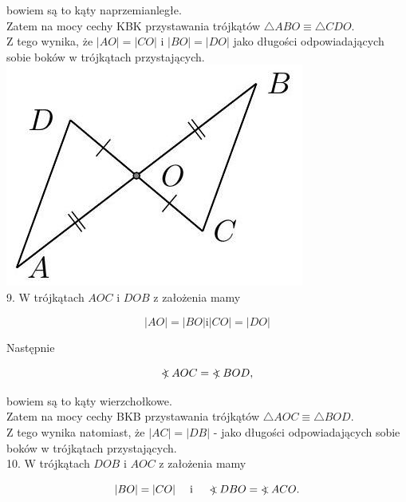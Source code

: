 \documentclass[10pt]{article}
\newcommand\Varangle{\mathop{{<\!\!\!\!\!\text{\small)}}\:}\nolimits}
\begin{document}
bowiem są to kąty naprzemianległe.\\
Zatem na mocy cechy KBK przystawania trójkątów \(\triangle A B O \equiv \triangle C D O\).\\
Z tego wynika, że \(|A O|=|C O|\) i \(|B O|=|D O|\) jako długości odpowiadających sobie boków w trójkątach przystających.\\
\includegraphics[max width=\textwidth, center]{2024_11_21_71f62bd117d375398909g-060(2)}\\
9. W trójkątach \(A O C\) i \(D O B\) z założenia mamy

\[
|A O|=|B O| \mathrm{i}|C O|=|D O|
\]

Następnie

\[
\Varangle A O C=\Varangle B O D,
\]

bowiem są to kąty wierzchołkowe.\\
Zatem na mocy cechy BKB przystawania trójkątów \(\triangle A O C \equiv \triangle B O D\).\\
Z tego wynika natomiast, że \(|A C|=|D B|\) - jako długości odpowiadających sobie boków w trójkątach przystających.\\
10. W trójkątach \(D O B\) i \(A O C\) z założenia mamy

\[
|B O|=|C O| \quad \text { i } \quad \Varangle D B O=\Varangle A C O .
\]
\end{document}
